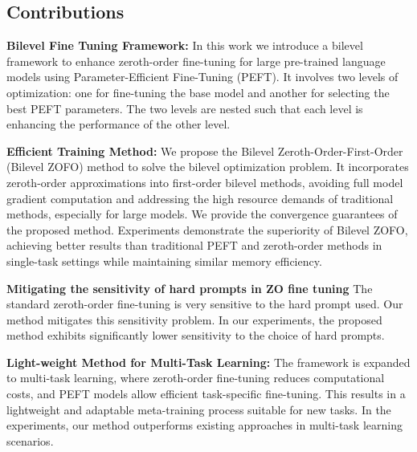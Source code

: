 \subsection{Contributions}
\textbf{Bilevel Fine Tuning Framework:} In this work we introduce a bilevel framework to enhance zeroth-order fine-tuning for large pre-trained language models using Parameter-Efficient Fine-Tuning (PEFT). It involves two levels of optimization: one for fine-tuning the base model and another for selecting the best PEFT parameters. The two levels are nested such that each level is enhancing the performance of the other level.

\textbf{Efficient Training Method:} We propose the Bilevel Zeroth-Order-First-Order (Bilevel ZOFO) method to solve the bilevel optimization problem. It incorporates zeroth-order approximations into first-order bilevel methods, avoiding full model gradient computation and addressing the high resource demands of traditional methods, especially for large models. We provide the convergence guarantees of the  proposed method. Experiments demonstrate the superiority of Bilevel ZOFO, achieving better results than traditional PEFT and zeroth-order methods in single-task settings while maintaining similar memory efficiency.

\textbf{Mitigating the sensitivity of hard prompts in ZO fine tuning} The standard zeroth-order fine-tuning is very sensitive to the hard prompt used. Our method mitigates this sensitivity problem. In our experiments, the proposed method exhibits significantly lower sensitivity to the choice of hard prompts.


\textbf{Light-weight Method for Multi-Task Learning:} The framework is expanded to multi-task learning, where zeroth-order fine-tuning reduces computational costs, and PEFT models allow efficient task-specific fine-tuning. This results in a lightweight and adaptable meta-training process suitable for new tasks. In the experiments, our method outperforms existing approaches in multi-task learning scenarios.
